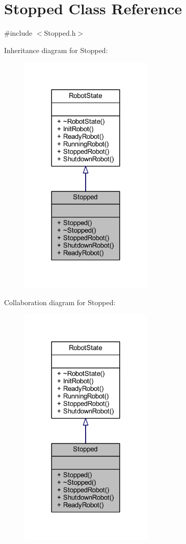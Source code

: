 \hypertarget{class_stopped}{}\section{Stopped Class Reference}
\label{class_stopped}


{\ttfamily \#include $<$Stopped.\+h$>$}



Inheritance diagram for Stopped\+:
\nopagebreak
\begin{figure}[H]
\begin{center}
\leavevmode
\includegraphics[width=180pt]{class_stopped__inherit__graph}
\end{center}
\end{figure}


Collaboration diagram for Stopped\+:
\nopagebreak
\begin{figure}[H]
\begin{center}
\leavevmode
\includegraphics[width=180pt]{class_stopped__coll__graph}
\end{center}
\end{figure}
